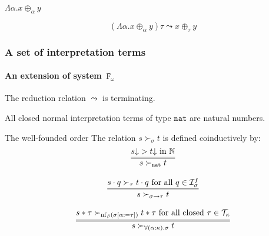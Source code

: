 \documentclass[10pt,presentation,color=names]{beamer}
\newcommand{\Fomega}{\mathtt{F}_\omega}
\newcommand{\Iterms}{\mathcal{I}}
\newcommand{\arrtype}{\rightarrow}
\newcommand{\app}[2]{#1 \cdot #2}
\newcommand{\tapp}[2]{#1 * #2}
\newcommand{\subst}[2]{#1:=#2}
\newcommand{\nat}{\mathtt{nat}}
\newcommand{\Tc}{\mathcal{T}}
\newcommand{\nf}{\mathrm{nf}}
\newcommand{\da}{\mathord{\downarrow}}
\begin{document}

\begin{frame}[noframenumbering]
  \begin{center}
    $\Lambda \alpha . x \oplus_\alpha y$
  \end{center}
  \pause
  \bigskip
  \[
  (\Lambda \alpha . x \oplus_\alpha y) \tau \leadsto x \oplus_\tau y
  \]
\end{frame}


\begin{frame}
  \frametitle{A set of interpretation terms}
  \framesubtitle{An extension of system~$\Fomega$}
  \begin{theorem}
    The reduction relation $\leadsto$ is terminating.
  \end{theorem}
  \pause
  \begin{corollary}
    All closed normal interpretation terms of type $\nat$ are natural
    numbers.
  \end{corollary}
\end{frame}

\begin{frame}{The well-founded order}
  The relation $s \succ_{\sigma} t$ is defined coinductively by:
  \[
  \begin{array}{c}
    \infer={s \succ_\nat t}{s\da > t\da \text{ in }\mathbb{N}} \\ \\
    \infer={s \succ_{\sigma\arrtype\tau} t}{\app{s}{q} \succ_{\tau} \app{t}{q} \text{ for all } q \in \Iterms^f_\sigma} \\ \\
    \infer={s \succ_{\forall(\alpha:\kappa).\sigma} t}{\tapp{s}{\tau} \succ_{\nf_\beta(\sigma[\subst{\alpha}{\tau}])} \tapp{t}{\tau} \text{ for all closed } \tau \in \Tc_{\kappa}}
  \end{array}
  \]


\end{frame}
\end{document}
